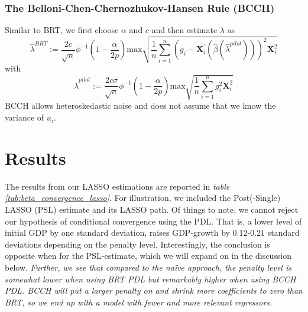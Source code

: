 \documentclass[11pt]{article}
\begin{document}
\subsubsection{The Belloni-Chen-Chernozhukov-Hansen Rule (BCCH)}
Similar to BRT, we first choose $\alpha$ and $c$ and then estimate $\lambda$ as
\begin{equation}
    \hat{\lambda}^{BRT}:=\frac{2c}{\sqrt{n}}\phi^{-1}\left(1-\frac{\alpha}{2p}\right) \text{max}\sqrt{\frac{1}{n}\sum_{i=1}^{n} (g_i-\mathbf{X}^{'}_i(\hat{\beta}(\hat{\lambda}^{pilot})))^{2} \mathbf{X}^{2}_{i}}
\end{equation}
with
\begin{equation}
    \hat{\lambda}^{pilot}:=\frac{2c\sigma}{\sqrt{n}}\phi^{-1}\left(1-\frac{\alpha}{2p}\right) \text{max}\sqrt{\frac{1}{n}\sum_{i=1}^{n}g^{2}_i \mathbf{X}^{2}_{i}}
\end{equation}
BCCH allows heteroskedastic noise and does not assume that we know the variance of $u_i$.

\section{Results}
The results from our LASSO estimations are reported in \textit{table \ref{tab:beta_convergence_lasso}}. For illustration, we included the Post(-Single) LASSO (PSL) estimate and its LASSO path. Of things to note, we cannot reject our hypothesis of conditional convergence using the PDL. That is, a lower level of initial GDP by one standard deviation, raises GDP-growth by 0.12-0.21 standard deviations depending on the penalty level. Interestingly, the conclusion is opposite when for the PSL-estimate, which we will expand on in the discussion below. \textit{Further, we see that compared to the naïve approach, the penalty level is somewhat lower when using BRT PDL but remarkably higher when using BCCH PDL. BCCH will put a larger penalty on and shrink more coefficients to zero than BRT, so we end up with a model with fewer and more relevant regressors.}
\end{document}
